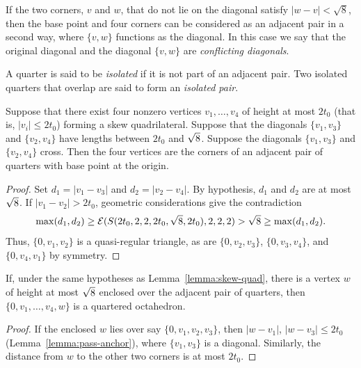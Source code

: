 \begin{definition}
If the two corners, $v$ and $w$, that do not lie on the diagonal
satisfy $|w-v|<\sqrt8$, then the base point and four corners can
be considered as an adjacent pair in a second way, where $\{v,w\}$
functions as the diagonal.  In this case we say that the original
diagonal and the diagonal $\{v,w\}$ are {\it conflicting
diagonals}. %
\end{definition}

\begin{definition}
A quarter is said to be {\it isolated} if it
is not part of an adjacent pair.  Two isolated quarters that
overlap are said to form an {\it isolated
pair}.
%
\end{definition}

\begin{lemma} \label{lemma:skew-quad}
Suppose that there exist four nonzero vertices $v_1,\ldots,v_4$ of
height at most $2t_0$ (that is, $|v_i|\le 2t_0$) forming a skew
quadrilateral. Suppose that the diagonals $\{v_1,v_3\}$ and
$\{v_2,v_4\}$ have lengths between $2t_0$ and $\sqrt8$. Suppose the
diagonals $\{v_1,v_3\}$ and $\{v_2,v_4\}$ cross. Then the four
vertices are the corners of an adjacent pair of quarters with base
point at the origin.
\end{lemma}

\begin{proof}
 Set $d_1=|v_1-v_3|$ and $d_2 = |v_2-v_4|$.
By hypothesis, $d_1$ and $d_2$ are at most $\sqrt8$.
 If $|v_1-v_2|>2t_0$,
geometric considerations give the contradiction
    $$\max(d_1,d_2)\ge {\mathcal E}(S(2t_0,2,2,2t_0,\sqrt8,2t_0),2,2,2) > \sqrt8
    \ge\max(d_1,d_2).$$
Thus, $\{0,v_1,v_2\}$ is a quasi-regular triangle,  as are
$\{0,v_2,v_3\}$, $\{0,v_3,v_4\}$, and $\{0,v_4,v_1\}$ by symmetry.
\end{proof}

\begin{lemma} \label{lemma:oct}
If, under the same hypotheses as Lemma~\ref{lemma:skew-quad},
there is a vertex $w$ of height at most $\sqrt8$ enclosed over the
adjacent pair of quarters, then $\{0,v_1,\ldots,v_4,w\}$ is a
quartered octahedron.
\end{lemma}


\begin{proof}
 If the enclosed $w$ lies over say $\{0,v_1,v_2,v_3\}$, then
$|w-v_1|$, $|w-v_3|\le 2t_0$ (Lemma~\ref{lemma:pass-anchor}), where
$\{v_1,v_3\}$ is a diagonal. Similarly, the distance from $w$ to the
other two corners is at most $2t_0$.
\end{proof}

